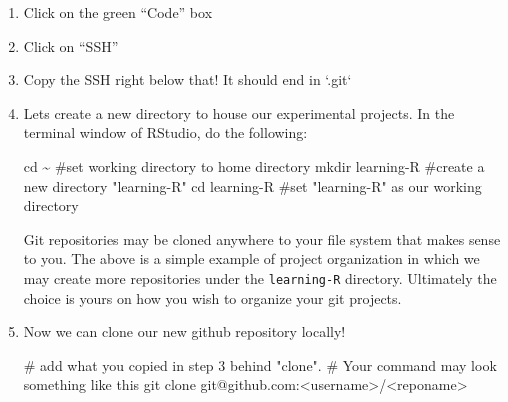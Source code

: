 \documentclass[
  letterpaper,
  DIV=11,
  numbers=noendperiod]{scrreprt}
\newenvironment{Shaded}{\begin{snugshade}}{\end{snugshade}}
\newcommand{\BuiltInTok}[1]{\textcolor[rgb]{0.00,0.23,0.31}{#1}}
\newcommand{\CommentTok}[1]{\textcolor[rgb]{0.37,0.37,0.37}{#1}}
\newcommand{\FunctionTok}[1]{\textcolor[rgb]{0.28,0.35,0.67}{#1}}
\newcommand{\NormalTok}[1]{\textcolor[rgb]{0.00,0.23,0.31}{#1}}
\newcommand{\OperatorTok}[1]{\textcolor[rgb]{0.37,0.37,0.37}{#1}}
\begin{document}
\begin{enumerate}
\def\labelenumi{\arabic{enumi}.}
\item
  Click on the green ``Code'' box
\item
  Click on ``SSH''
\item
  Copy the SSH right below that! It should end in `.git`
\item
  Lets create a new directory to house our experimental projects. In the
  terminal window of RStudio, do the following:

\begin{Shaded}
\begin{Highlighting}[]
\BuiltInTok{cd}\NormalTok{ \textasciitilde{}                 }\CommentTok{\#set working directory to home directory}
\FunctionTok{mkdir}\NormalTok{ learning{-}R     }\CommentTok{\#create a new directory "learning{-}R"}
\BuiltInTok{cd}\NormalTok{ learning{-}R        }\CommentTok{\#set "learning{-}R" as our working directory}
\end{Highlighting}
\end{Shaded}

  \begin{tcolorbox}[enhanced jigsaw, left=2mm, colframe=quarto-callout-note-color-frame, leftrule=.75mm, opacitybacktitle=0.6, toptitle=1mm, title=\textcolor{quarto-callout-note-color}{\faInfo}\hspace{0.5em}{Note}, opacityback=0, coltitle=black, colbacktitle=quarto-callout-note-color!10!white, breakable, colback=white, titlerule=0mm, bottomrule=.15mm, arc=.35mm, bottomtitle=1mm, rightrule=.15mm, toprule=.15mm]

  Git repositories may be cloned anywhere to your file system that makes
  sense to you. The above is a simple example of project organization in
  which we may create more repositories under the \texttt{learning-R}
  directory. Ultimately the choice is yours on how you wish to organize
  your git projects.

  \end{tcolorbox}
\item
  Now we can clone our new github repository locally!

\begin{Shaded}
\begin{Highlighting}[]
\CommentTok{\# add what you copied in step 3 behind "clone".}
\CommentTok{\# Your command may look something like this}
\FunctionTok{git}\NormalTok{ clone git@github.com:}\OperatorTok{\textless{}}\NormalTok{username}\OperatorTok{\textgreater{}}\NormalTok{/}\OperatorTok{\textless{}}\NormalTok{reponame}\OperatorTok{\textgreater{}}
\end{Highlighting}
\end{Shaded}
\end{enumerate}
\end{document}
